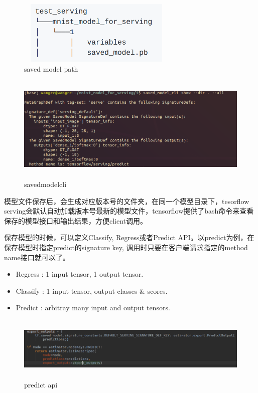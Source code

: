 \documentclass[12pt,a4paper,oneside]{article}
\begin{document}
\begin{CJK*}{UTF8}{gbsn}
\begin{figure}[H]
\centering
\includegraphics[width=3in,height=1.2in]{modelpath}
\caption{saved model path}
\end{figure}

\begin{figure}[H]
\centering
\includegraphics[width=6in,height=2in]{savedmodelcli}
\caption{savedmodelcli}
\end{figure}
模型文件保存后，会生成对应版本号的文件夹，在同一个模型目录下，tesorflow serving会默认自动加载版本号最新的模型文件，tensorflow提供了bash命令来查看保存的模型接口和输出结果，方便client调用。

保存模型的时候，可以定义Classify, Regress或者Predict API。以predict为例，在保存模型时指定predict的signature key, 调用时只要在客户端请求指定的method name接口就可以了。

\begin{itemize}
\item Regress : 1 input tensor, 1 output tensor.
\item Classify : 1 input tensor, output classes \& scores.
\item Predict : arbitray many input and output tensors.
\end{itemize}


\begin{figure}[H]
\centering
\includegraphics[width=6in,height=1.2in]{predictapi}
\caption{predict api}
\end{figure}


\end{CJK*}
\end{document}
